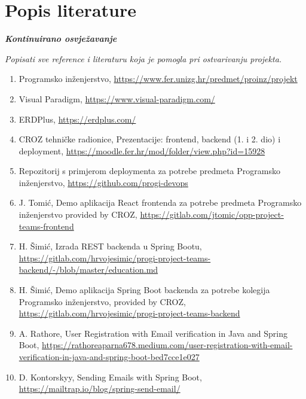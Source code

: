 \chapter*{Popis literature}
	 	
 		\textbf{\textit{Kontinuirano osvježavanje}}
	
		\textit{Popisati sve reference i literaturu koja je pomogla pri ostvarivanju projekta.}
		
		
		\begin{enumerate}
			
			\item Programsko inženjerstvo, \url{https://www.fer.unizg.hr/predmet/proinz/projekt}
			
			\item Visual Paradigm, \url{https://www.visual-paradigm.com/}
			
			\item ERDPlus, \url{https://erdplus.com/}
			
			\item CROZ tehničke radionice, Prezentacije: frontend, backend (1. i 2. dio) i deployment, \url{https://moodle.fer.hr/mod/folder/view.php?id=15928}
			
			\item Repozitorij s primjerom deploymenta za potrebe predmeta Programsko inženjerstvo, \url{https://github.com/progi-devops}
			
			\item J. Tomić, Demo aplikacija React frontenda za potrebe predmeta Programsko inženjerstvo provided by CROZ, 
			\url{https://gitlab.com/jtomic/opp-project-teams-frontend}
			
			\item H. Šimić, Izrada REST backenda u Spring Bootu, \url{https://gitlab.com/hrvojesimic/progi-project-teams-backend/-/blob/master/education.md}
			
			\item H. Šimić, Demo aplikacija Spring Boot backenda za potrebe kolegija Programsko inženjerstvo, provided by CROZ, \url{https://gitlab.com/hrvojesimic/progi-project-teams-backend}
			
			\item A. Rathore, User Registration with Email verification in Java and Spring Boot, \url{https://rathoreaparna678.medium.com/user-registration-with-email-verification-in-java-and-spring-boot-bed7cce1e027}
			
			\item  D. Kontorskyy, Sending Emails with Spring Boot, 	\url{https://mailtrap.io/blog/spring-send-email/}
			

\end{enumerate}
